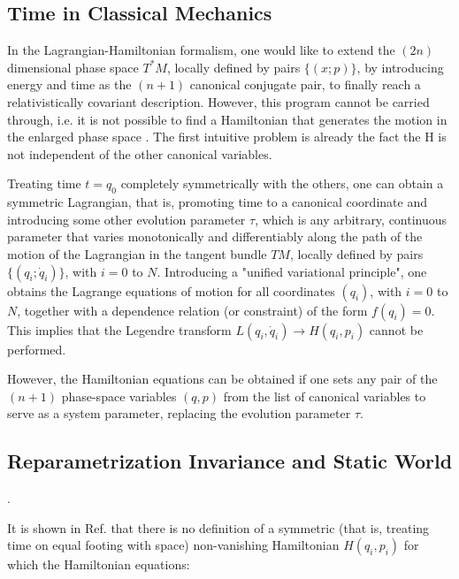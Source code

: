 \documentclass[a4paper,10pt]{article}
\numberwithin{equation}{section}
\begin{document}
\subsection{Time in Classical Mechanics}


In the Lagrangian-Hamiltonian formalism, one would like to extend the $(2n)$ dimensional phase space $T^*M$, locally defined by pairs $\{(x; p)\}$, by introducing energy and time as the $(n + 1)$ canonical conjugate pair, to finally reach a relativistically covariant description. However, this program cannot be carried through, i.e. it is not possible to find a Hamiltonian that generates the motion in the enlarged phase space \cite{JanNoTimeCoordinate}. The first intuitive problem is already the fact the H is not independent of the other canonical variables. 

Treating time $t = q_0$ completely symmetrically with the others, one can obtain a symmetric Lagrangian, that is, promoting time to a canonical coordinate and introducing some other evolution parameter $\tau$, which is any arbitrary, continuous parameter that varies monotonically and differentiably along the path of the motion of the Lagrangian in the tangent bundle $TM$, locally defined by pairs$\{(q_i; \dot{q}_i)\}$, with $i = 0$ to $N$. Introducing a "unified variational principle", one obtains the Lagrange equations of motion for all coordinates $(q_i)$, with $i = 0$ to $N$, together with a dependence relation (or constraint) of the form $f(q_i) = 0$. This implies that the Legendre transform $L(q_i, \dot{q}_i) \rightarrow H(q_i, p_i)$ cannot be performed.


However, the Hamiltonian equations can be obtained if one sets any pair of the $(n + 1)$  phase-space variables $(q, p)$ from the list of canonical variables to serve as a system parameter, replacing the evolution parameter $\tau$.

\subsection{Reparametrization Invariance and Static World}
\label{frozenintime}.

It is shown in Ref. \cite{noHamiltonian} that there is no definition of a symmetric (that is, treating time on equal footing with space) non-vanishing Hamiltonian $H(q_i, p_i)$ for which the Hamiltonian equations:
\end{document}

